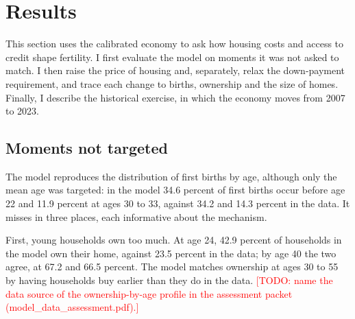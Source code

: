 \providecommand{\mocktodo}[1]{\textcolor{red}{[TODO: #1]}}

\section{Results}
\label{sec:results}

This section uses the calibrated economy to ask how housing costs and access
to credit shape fertility. I first evaluate the model on moments it was not
asked to match. I then raise the price of housing and, separately, relax the
down-payment requirement, and trace each change to births, ownership and the
size of homes. Finally, I describe the historical exercise, in which the
economy moves from 2007 to 2023.

\subsection{Moments not targeted}

The model reproduces the distribution of first births by age, although only
the mean age was targeted: in the model 34.6 percent of first births occur
before age 22 and 11.9 percent at ages 30 to 33, against 34.2 and 14.3 percent
in the data. It misses in three places, each informative about the mechanism.

First, young households own too much. At age 24, 42.9 percent of households
in the model own their home, against 23.5 percent in the data; by age 40 the
two agree, at 67.2 and 66.5 percent. The model matches ownership at ages 30
to 55 by having households buy earlier than they do in the data.
\mocktodo{name the data source of the ownership-by-age profile in the
assessment packet (model\_data\_assessment.pdf).}

